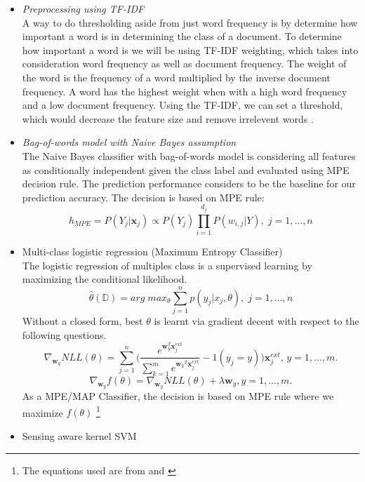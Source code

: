 \documentclass[a4paper, 11pt]{article}
\newcommand\blfootnote[1]{%
	\begingroup
	\renewcommand\thefootnote{}\footnote{#1}%
	\addtocounter{footnote}{-1}%
	\endgroup
}
\begin{document}
	\begin{itemize}
		\item \textit{ Preprocessing using TF-IDF} \\
		A way to do thresholding aside from just word frequency is by determine how important a word is in determining the class of a document. To determine how important a word is we will be using TF-IDF  weighting, which takes into consideration word frequency as well as document frequency. The weight of the word is the frequency of a word multiplied by the inverse document frequency. A word has the highest weight when with a high word frequency and a low document frequency. Using the TF-IDF, we can set a threshold, which would decrease the feature size and remove irrelevent words \cite{schutze2008introduction}.
		
		\item \textit{Bag-of-words model with Naive Bayes assumption}\\
		The Naive Bayes classifier with bag-of-words model is considering all features as conditionally independent given the class label and evaluated using MPE decision rule.\cite{ishwarspring18} The prediction performance considers to be the baseline for our prediction accuracy. 
		The decision is based on MPE rule:
		\[h_{MPE} = P(Y_j|\pmb{x}_j) \propto P(Y_j)\prod^{d_j}_{i=1}P(w_{i,j}|Y), \;j = 1,\ldots,n\]
		\item Multi-class logistic regression (Maximum Entropy Classifier) \\
		The logistic regression of multiples class is a supervised learning by maximizing the conditional likelihood.
		\[\hat{\theta}(\mathbb{D}) = arg \; max_\theta \sum_{j=1}^{n}p(y_j|x_j,\theta), \;j = 1,\ldots,n\]Without a closed form, best $\theta$ is learnt via gradient decent with respect to the following questions. 
		\[\nabla_{\pmb{w}_y}NLL(\theta) = \sum_{j=1}^{n}\bigg(\frac{e^{\pmb{w}_y^T\pmb{x}_j^{ext}}}{\sum_{k=1}^{m}e^{{\pmb{w}_k}^T\pmb{x}_j^{ext}}}-1(y_j = y)\bigg)\pmb{x}^{ext}_{j},\,y=1,\ldots,m.\]
		\[\nabla_{\pmb{w}_y}f(\theta) = \nabla_{\pmb{w}_y}NLL(\theta)+\lambda\pmb{w}_{y},y=1,\ldots,m.\]
		As a MPE/MAP Classifier, the decision is based on MPE rule where we maximize $f(\theta)$
		\blfootnote{The equations used are from \cite{song1999general} and \cite{ishwarspring18}}
		\item Sensing aware kernel SVM \cite{ding2014sensing}\\

\end{itemize}
\end{document}
